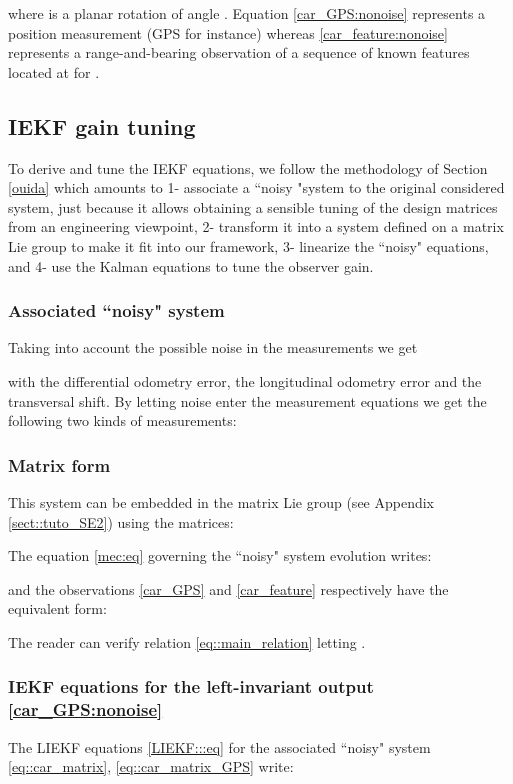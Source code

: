 \documentclass[a4paper,12pt,onecolumn]{article}
\begin{document}
where  is a planar rotation of angle . Equation
\eqref{car_GPS:nonoise} represents a  position measurement (GPS for instance) whereas \eqref{car_feature:nonoise} represents a range-and-bearing observation of a sequence of known features located at  for .

\subsection{IEKF gain tuning}
\label{sect::gain_tuning_car}

To derive and tune the IEKF equations, we follow the methodology of Section \ref{ouida} which amounts to 1- associate a ``noisy "system to the original considered system, just because it allows obtaining a sensible  tuning of the design matrices from an engineering viewpoint, 2- transform it into a system defined on a matrix Lie group to make it fit into our framework, 3- linearize the ``noisy" equations, and 4- use the Kalman equations to tune the observer gain. 

\subsubsection{Associated ``noisy" system}
Taking into account the possible noise in the measurements we get

with  the differential odometry error,  the longitudinal odometry error and  the transversal shift. By letting noise enter the measurement equations we get the following two kinds of measurements:


\subsubsection{Matrix form}
This system can be embedded in the matrix Lie group  (see Appendix \ref{sect::tuto_SE2}) using the   matrices:


 The equation \eqref{mec:eq} governing the ``noisy" system evolution writes:

and the observations \eqref{car_GPS} and \eqref{car_feature}  respectively have the equivalent form:




The reader can verify relation \eqref{eq::main_relation} letting .



\subsubsection{IEKF equations for the left-invariant output \eqref{car_GPS:nonoise}}
\label{ex::car_GPS}
The LIEKF  equations \eqref{LIEKF:::eq} for the associated ``noisy" system \eqref{eq::car_matrix}, \eqref{eq::car_matrix_GPS} write:
\end{document}
